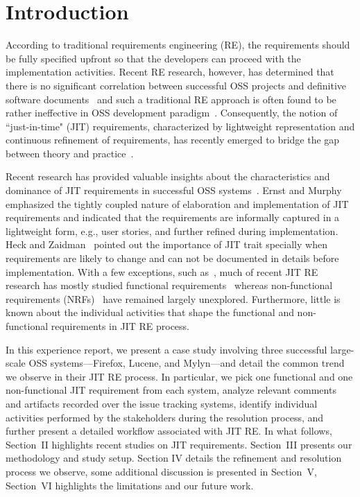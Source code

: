 \documentclass[review]{elsarticle}
\begin{document}

\section{Introduction}

According to traditional requirements engineering (RE), the requirements should be fully specified upfront so that the developers can proceed with the implementation activities. Recent RE research, however, has determined that there is no significant correlation between successful OSS projects and definitive software documents~\cite{scacchi05} and such a traditional RE approach is often found to be rather ineffective in OSS development paradigm~\cite{ernst12}. Consequently, the notion of ``just-in-time" (JIT) requirements, characterized by lightweight representation and continuous refinement of requirements, has recently emerged to bridge the gap between theory and practice~\cite{alspaugh2013ongoing}.

Recent research has provided valuable insights about the characteristics and dominance of JIT requirements in successful OSS systems~\cite{ernst12, scacchi02, heck15, nanniu14, mlee, bhowmik15}. Ernst and Murphy~\cite{ernst12} emphasized the tightly coupled nature of elaboration and implementation of JIT requirements and indicated that the requirements are informally captured in a lightweight form, e.g., user stories, and further refined during implementation. Heck and Zaidman~\cite{heck15} pointed out the importance of JIT trait specially when requirements are likely to change and can not be documented in details before implementation. With a few exceptions, such as~\cite{ernst12}, much of recent JIT RE research has mostly studied functional requirements~\cite{Cysneiros2004} whereas non-functional requirements (NRFs)~\cite{Cysneiros2004} have remained largely unexplored. Furthermore, little is known about the individual activities that shape the functional and non-functional requirements in JIT RE process.

In this experience report, we present a case study involving three successful large-scale OSS systems---Firefox, Lucene, and Mylyn---and detail the common trend we observe in their JIT RE process. In particular, we pick one functional and one non-functional JIT requirement from each system, analyze relevant comments and artifacts recorded over the issue tracking systems, identify individual activities performed by the stakeholders during the resolution process, and further present a detailed workflow associated with JIT RE. In what follows, Section~II highlights recent studies on JIT requirements. Section~III presents our methodology and study setup. Section IV details the refinement and resolution process we observe, some additional discussion is presented in Section~V, Section~VI highlights the limitations and our future work.     
\end{document}
